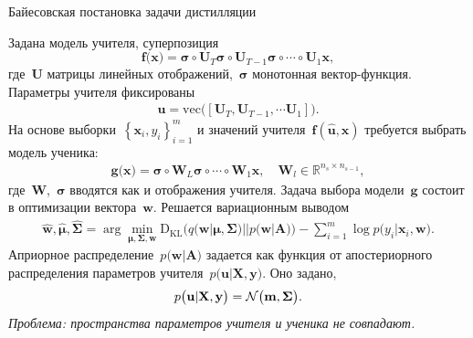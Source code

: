 \documentclass[10pt,pdf,hyperref={unicode}]{beamer}
\begin{document}

\begin{frame}{Байесовская постановка задачи дистилляции}

Задана модель учителя, суперпозиция
\[
\mathbf{f}\bigr(\mathbf{x}\bigr) = \bm{\sigma} \circ \mathbf{U}_T\bm{\sigma} \circ \mathbf{U}_{T-1}\bm{\sigma} \circ \cdots \circ \mathbf{U}_1\mathbf{x},
\]
где~$\mathbf{U}$ матрицы линейных отображений,~$\bm{\sigma}$ монотонная вектор-функция. Параметры учителя фиксированы
\[
\begin{aligned}
\mathbf{u} = \text{vec}\bigr(\left[\mathbf{U}_T, \mathbf{U}_{T-1}, \cdots \mathbf{U}_1\right]\bigr).
\end{aligned}
\]
На основе выборки~$\left\{\mathbf{x}_i, y_i\right\}_{i=1}^{m}$ и значений учителя~$\mathbf{f}(\hat{\mathbf{u}},\mathbf{x})$ требуется выбрать модель ученика:
\[
\begin{aligned}
\mathbf{g}\bigr(\mathbf{x}\bigr) = \bm{\sigma} \circ \mathbf{W}_L\bm{\sigma} \circ \cdots \circ \mathbf{W}_1\mathbf{x}, \quad \mathbf{W}_l \in \mathbb{R}^{n_s \times n_{s-1}},
\end{aligned}
\]
где~$\mathbf{W}$,~$\bm{\sigma}$ вводятся как и отображения учителя. Задача выбора модели~$\mathbf{g}$ состоит в оптимизации вектора~$\mathbf{w}$.  Решается  вариационным выводом
\[
\begin{aligned}
\hat{\mathbf{w}}, \hat{\bm{\mu}}, \hat{\bm{\Sigma}} = \arg \min_{\bm{\mu}, \bm{\Sigma}, \mathbf{w}} \text{D}_{\text{KL}}\bigr(q\bigr(\mathbf{w}|\bm{\mu}, \bm{\Sigma}\bigr)||p\bigr(\mathbf{w}|\mathbf{A}\bigr)\bigr) - \sum_{i=1}^{m}\log p\bigr(y_i|\mathbf{x}_{i}, \mathbf{w}\bigr).
\end{aligned}
\]
Априорное распределение~$p\bigr(\mathbf{w}|\mathbf{A}\bigr)$ задается как функция от апостериорного распределения параметров учителя~$p\bigr(\mathbf{u}|\mathbf{X}, \mathbf{y}\bigr)$.  Оно задано,
\[
\setlength\abovedisplayskip{0pt}
\begin{aligned}
p\bigr(\mathbf{u}|\mathbf{X}, \mathbf{y}\bigr) = \mathcal{N}\bigr(\mathbf{m}, \bm{\Sigma}\bigr).
\end{aligned}
\]
{\it \color{red}Проблема: пространства параметров учителя и ученика не совпадают.}
\end{frame}
\end{document}
